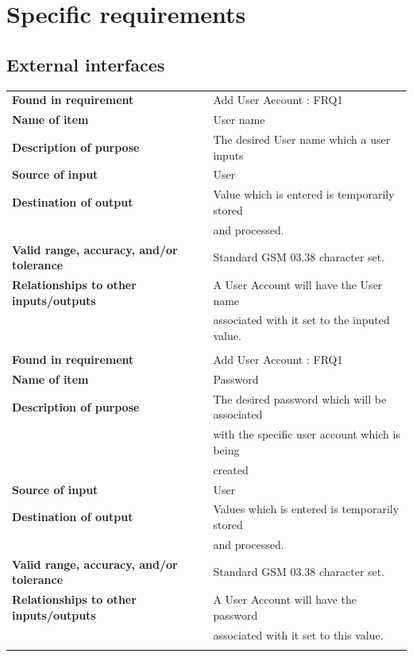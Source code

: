 \section{Specific requirements}

\subsection{External interfaces}
\begin{tabular}{ll}
\textbf{Found in requirement}&Add User Account : FRQ1\\
\textbf{Name of item}&User name\\
\textbf{Description of purpose}&The desired User name which a user inputs\\
\textbf{Source of input}&User\\
\textbf{Destination of output}&Value which is entered is temporarily stored \\&and processed.\\
\textbf{Valid range, accuracy, and/or tolerance}&Standard GSM 03.38 character set.\\
\textbf{Relationships to other inputs/outputs}&A User Account will have the User name \\&associated with it set to the inputed value.\\
&\\
\textbf{Found in requirement}&Add User Account : FRQ1\\
\textbf{Name of item}&Password\\
\textbf{Description of purpose}&The desired password which will be associated\\& with the specific user account which is being\\& created\\
\textbf{Source of input}&User\\
\textbf{Destination of output}&Values which is entered is temporarily stored \\&and processed.\\
\textbf{Valid range, accuracy, and/or tolerance}&Standard GSM 03.38 character set.\\
\textbf{Relationships to other inputs/outputs}&A User Account will have the password\\& associated with it set to this value.\\
&\\

\end{tabular}
